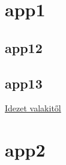 \documentclass[twoside,12pt]{article}
\begin{document}
\appendix
\section{app1}
\label{cimkeneve3}
\subsection{app12}

\begin{verse}
\hulipsum[1-2]
\end{verse}

\subsection{app13}
\begin{quote}
\hulipsum[1-2]
\end{quote}
\href{https://www.uni-miskolc.hu/~viktoria.vadon/TEX/1het/}{Idezet valakitől}
\section{app2}

\begin{quotation}
\hulipsum[1-2]
\end{quotation}
\end{document}
